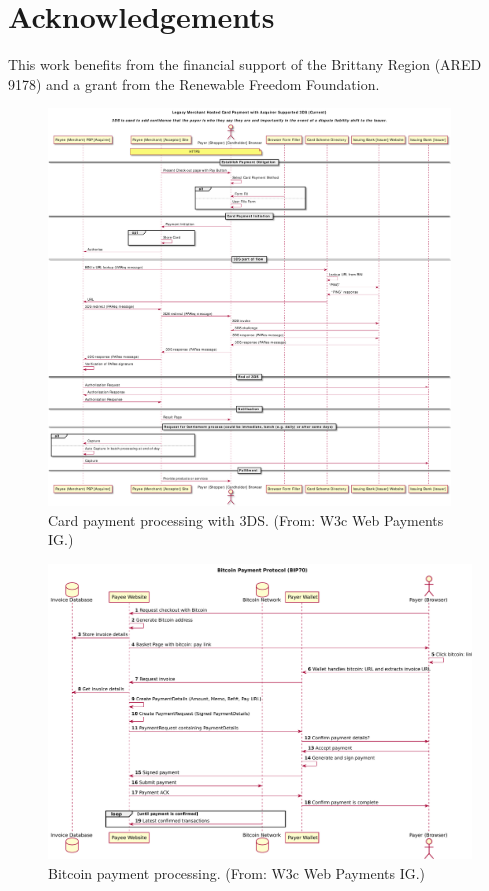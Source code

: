 \documentclass{IEEEtran}
\begin{document}
\section*{Acknowledgements}

This work benefits from the financial support of the Brittany Region
(ARED 9178) and a grant from the Renewable Freedom Foundation.




\appendix

\begin{figure}
\begin{center}
\includegraphics[width=0.95\textwidth]{figs/cc3ds.pdf}
\end{center}
\caption{Card payment processing with 3DS. (From: W3c Web Payments IG.)}
\label{fig:cc3ds}
\end{figure}



\begin{figure}
\includegraphics[width=\textwidth]{figs/bitcoin.pdf}
\caption{Bitcoin payment processing. (From: W3c Web Payments IG.)}
\label{fig:bitcoin}
\end{figure}
\end{document}
